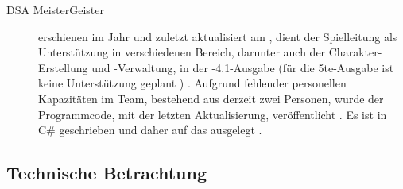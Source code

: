 \begin{description}
    \item[DSA MeisterGeister] erschienen im Jahr  und zuletzt aktualisiert am , dient der Spielleitung als Unterstützung in verschiedenen Bereich, darunter auch der Charakter-Erstellung und -Verwaltung, in der -4.1-Ausgabe (für die 5te-Ausgabe ist keine Unterstützung geplant ) .
    Aufgrund fehlender personellen Kapazitäten im Team, bestehend aus derzeit zwei Personen, wurde der Programmcode, mit der letzten Aktualisierung, veröffentlicht .
    Es ist in C\# geschrieben und daher auf das   ausgelegt .
\end{description}


\subsection{Technische Betrachtung}
\label{subsec:technische-betrachtung}

